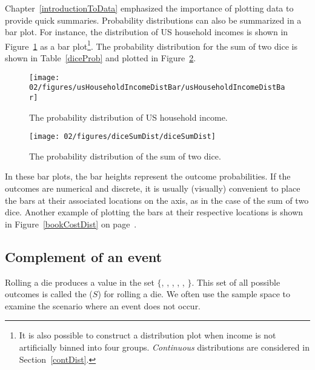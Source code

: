 Chapter~\ref{introductionToData} emphasized the importance of plotting data to provide quick summaries. Probability distributions can also be summarized in a bar plot. For instance, the distribution of US household incomes is shown in Figure~\ref{usHouseholdIncomeDistBar} as a bar plot\footnote{It is also possible to construct a distribution plot when income is not artificially binned into four groups. \emph{Continuous} distributions are considered in Section~\ref{contDist}.}. The probability distribution for the sum of two dice is shown in Table~\ref{diceProb} and plotted in Figure~\ref{diceSumDist}.

\begin{figure}
\centering
\texttt{[image: 02/figures/usHouseholdIncomeDistBar/usHouseholdIncomeDistBar]}
\caption{The probability distribution of US household income.}
\label{usHouseholdIncomeDistBar}
\end{figure}

\begin{figure}
\centering
\texttt{[image: 02/figures/diceSumDist/diceSumDist]}
\caption{The probability distribution of the sum of two dice.}
\label{diceSumDist}
\end{figure}

In these bar plots, the bar heights represent the outcome probabilities. If the outcomes are numerical and discrete, it is usually (visually) convenient to place the bars at their associated locations on the axis, as in the case of the sum of two dice. Another example of plotting the bars at their respective locations is shown in Figure~\ref{bookCostDist} on page~\pageref{bookCostDist}.

\subsection{Complement of an event}

Rolling a die produces a value in the set $\{$, , , , , $\}$. This set of all possible outcomes is called the  ($S$) for rolling a die. We often use the sample space to examine the scenario where an event does not occur.

